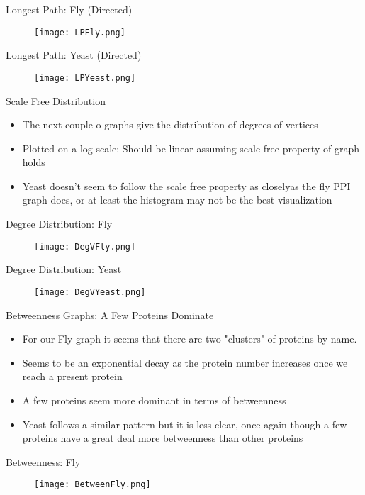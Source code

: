 \documentclass[xcolor=table]{beamer}
\begin{document}
\begin{frame}{Longest Path: Fly (Directed)}
\begin{figure}[H]
\texttt{[image: LPFly.png]}
\end{figure}
\end{frame}

\begin{frame}{Longest Path: Yeast (Directed)}
    \begin{figure}[H]
\centering
\texttt{[image: LPYeast.png]}
\end{figure}
\end{frame}
\begin{frame}{Scale Free Distribution}
    \begin{itemize}
        \item The next couple o graphs give the distribution of degrees of vertices
        \item Plotted on a log scale: Should be linear assuming scale-free property of graph holds
        \item Yeast doesn't seem to follow the scale free property as closelyas the fly PPI graph does, or at least the histogram may not be the best visualization
    \end{itemize}
\end{frame}
\begin{frame}{Degree Distribution: Fly}
    \begin{figure}[H]
\centering
\texttt{[image: DegVFly.png]}
\end{figure}
\end{frame}

\begin{frame}{Degree Distribution: Yeast}
    \begin{figure}[H]
\centering
\texttt{[image: DegVYeast.png]}
\end{figure}
\end{frame}

\begin{frame}{Betweenness Graphs: A Few Proteins Dominate}
    \begin{itemize}
        \item For our Fly graph it seems that there are two "clusters" of proteins by name.
        \item Seems to be an exponential decay as the protein number increases once we reach a present protein
        \item A few proteins seem more dominant in terms of betweenness
        \item Yeast follows a similar pattern but it is less clear, once again though a few proteins have a great deal more betweenness than other proteins
    \end{itemize}
\end{frame}
\begin{frame}{Betweenness: Fly}
    \begin{figure}[H]
\centering
\texttt{[image: BetweenFly.png]}
\end{figure}
\end{frame}
\end{document}
